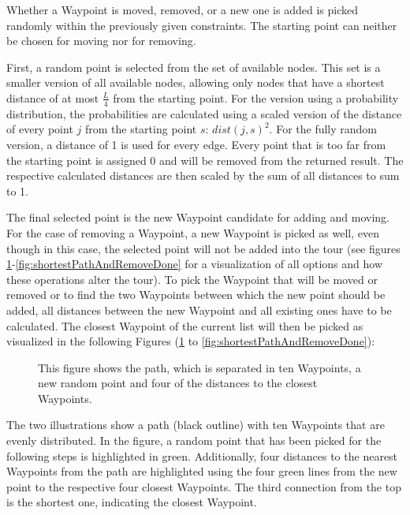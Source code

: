 Whether a Waypoint is moved, removed, or a new one is added is picked randomly within the previously given constraints.
The starting point can neither be chosen for moving nor for removing.

First, a random point is selected from the set of available nodes.
This set is a smaller version of all available nodes, allowing only nodes that have a shortest distance of at most $\frac{L}{4}$ from the starting point. 
For the version using a probability distribution, the probabilities are calculated using a scaled version of the distance of every point $j$ from the starting point $s$: $dist(j,s)^2$.
For the fully random version, a distance of 1 is used for every edge.
Every point that is too far from the starting point is assigned 0 and will be removed from the returned result.
The respective calculated distances are then scaled by the sum of all distances to sum to 1.

The final selected point is the new Waypoint candidate for adding and moving.
For the case of removing a Waypoint, a new Waypoint is picked as well, even though in this case, the selected point will not be added into the tour (see figures \ref{fig:tour_picked_waypoint_shortest_paths}-\ref{fig:shortestPathAndRemoveDone} for a visualization of all options and how these operations alter the tour).
To pick the Waypoint that will be moved or removed or to find the two Waypoints between which the new point should be added, all distances between the new Waypoint and all existing ones have to be calculated.
The closest Waypoint of the current list will then be picked as visualized in the following Figures (\ref{fig:tour_picked_waypoint_shortest_paths} to \ref{fig:shortestPathAndRemoveDone}):
%
%		
	\begin{figure}
		\centering
		
		\caption{This figure shows the path, which is separated in ten Waypoints, a new random point and four of the distances to the closest Waypoints.}
		\label{fig:tour_picked_waypoint_shortest_paths}
	\end{figure}

The two illustrations show a path (black outline) with ten Waypoints that are evenly distributed.
In the figure, a random point that has been picked for the following steps is highlighted in green.
Additionally, four distances to the nearest Waypoints from the path are highlighted using the four green lines from the new point to the respective four closest Waypoints.
The third connection from the top is the shortest one, indicating the closest Waypoint.

